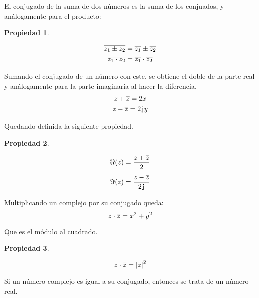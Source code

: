 \documentclass[a5paper,12pt,twoside]{book}
\newtheorem{prop}{{Propiedad}}[chapter]
\begin{document}
El conjugado de la suma de dos números es la suma de los conjuados, y análogamente para el producto:

\begin{mdframed}[style=PropertyFrame]
    \begin{prop}
        \label{prop:zw*=(z*w)*}
    \end{prop}
    \begin{gather*}
        \overline{z_1 \pm z_2} = \overline{z_1} \pm \overline{z_2}
        \\
        \overline{z_1 \cdot z_2} = \overline{z_1} \cdot \overline{z_2}
    \end{gather*}
\end{mdframed}

Sumando el conjugado de un número con este, se obtiene el doble de la parte real y análogamente para la parte imaginaria al hacer la diferencia.
\begin{gather*}
        z+\overline{z} = 2x
        \\
        z-\overline{z} = 2 \mkern2mu\mathrm{j}\mkern1mu y
    \end{gather*}

Quedando definida la siguiente propiedad.

\begin{mdframed}[style=PropertyFrame]
    \begin{prop}
        \label{prop:ReIm}
    \end{prop}
    \begin{align*}
        \Re (z) &= \frac{z+\overline{z}}{2}
        \\[1ex]
        \Im (z) &= \frac{z-\overline{z}}{2 \mkern2mu\mathrm{j}\mkern1mu}
    \end{align*}
\end{mdframed}

Multiplicando un complejo por su conjugado queda:
\begin{equation*}
    z \cdot \overline{z} = x^2+y^2
\end{equation*}

Que es el módulo al cuadrado.

\begin{mdframed}[style=PropertyFrame]
    \begin{prop}
        \label{prop:|z|^2=z.z*}
    \end{prop}
    \begin{equation*}
        z \cdot \overline{z} = {\left| {z} \right|}^2
    \end{equation*}
\end{mdframed}

Si un número complejo es igual a su conjugado, entonces se trata de un número real.
\end{document}
